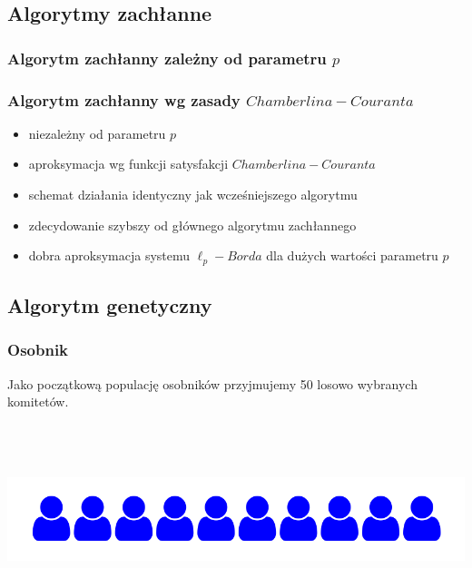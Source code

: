 \documentclass{beamer}
\begin{document}
\subsection{Algorytmy zachłanne}
\begin{frame}
\frametitle{Algorytm zachłanny zależny od parametru $p$}

\begin{algorithm}[H]
{}
\end{algorithm}

\end{frame}

\begin{frame}
\frametitle{Algorytm zachłanny wg zasady $Chamberlina-Couranta$}
\begin{itemize}
\item niezależny od parametru $p$
\item aproksymacja wg funkcji satysfakcji $Chamberlina-Couranta$
\item schemat działania identyczny jak wcześniejszego algorytmu
\item zdecydowanie szybszy od głównego algorytmu zachłannego
\item dobra aproksymacja systemu $\ell_p-Borda$ dla dużych wartości parametru $p$   
\end{itemize}

\end{frame}


\subsection{Algorytm genetyczny}

\begin{frame}
\frametitle{Osobnik}
Jako początkową populację osobników przyjmujemy 50 losowo wybranych komitetów.

~ \\ ~ \\ ~ \\

\includegraphics[width=0.8\paperwidth]{pics/committee.png}


\end{frame}
\end{document}
